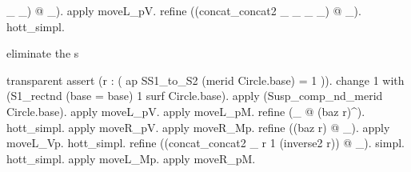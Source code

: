 \begin{coqdoccode}
\begin{coqdoccomment}
\_\coqdocindent{0.50em}
\_)\coqdocindent{0.50em}
@\coqdocindent{0.50em}
\_).\coqdocindent{0.50em}
apply\coqdocindent{0.50em}
moveL\_pV.\coqdoceol
\coqdocindent{1.00em}
refine\coqdocindent{0.50em}
((concat\_concat2\coqdocindent{0.50em}
\_\coqdocindent{0.50em}
\_\coqdocindent{0.50em}
\_\coqdocindent{0.50em}
\_)\coqdocindent{0.50em}
@\coqdocindent{0.50em}
\_).\coqdocindent{0.50em}
hott\_simpl.\coqdoceol
\coqdocindent{1.00em}
\coqdoceol
\coqdocindent{1.00em}
\begin{coqdoccomment}
\coqdocindent{0.50em}
eliminate\coqdocindent{0.50em}
the\coqdocindent{0.50em}
s\coqdocindent{0.50em}
\end{coqdoccomment}
\coqdoceol
\coqdocindent{1.00em}
transparent\coqdocindent{0.50em}
assert\coqdocindent{0.50em}
(r\coqdocindent{0.50em}
:\coqdocindent{0.50em}
(\coqdoceol
\coqdocindent{2.00em}
ap\coqdocindent{0.50em}
SS1\_to\_S2\coqdocindent{0.50em}
(merid\coqdocindent{0.50em}
Circle.base)\coqdocindent{0.50em}
=\coqdocindent{0.50em}
1\coqdoceol
\coqdocindent{1.00em}
)).\coqdoceol
\coqdocindent{1.00em}
change\coqdocindent{0.50em}
1\coqdocindent{0.50em}
with\coqdocindent{0.50em}
(S1\_rectnd\coqdocindent{0.50em}
(base\coqdocindent{0.50em}
=\coqdocindent{0.50em}
base)\coqdocindent{0.50em}
1\coqdocindent{0.50em}
surf\coqdocindent{0.50em}
Circle.base).\coqdocindent{0.50em}
\coqdoceol
\coqdocindent{1.00em}
apply\coqdocindent{0.50em}
(Susp\_comp\_nd\_merid\coqdocindent{0.50em}
Circle.base).\coqdoceol
\coqdocindent{1.00em}
apply\coqdocindent{0.50em}
moveL\_pV.\coqdocindent{0.50em}
apply\coqdocindent{0.50em}
moveL\_pM.\coqdoceol
\coqdocindent{1.00em}
refine\coqdocindent{0.50em}
(\_\coqdocindent{0.50em}
@\coqdocindent{0.50em}
(baz\coqdocindent{0.50em}
r)\^{}).\coqdocindent{0.50em}
hott\_simpl.\coqdoceol
\coqdocindent{1.00em}
apply\coqdocindent{0.50em}
moveR\_pV.\coqdocindent{0.50em}
apply\coqdocindent{0.50em}
moveR\_Mp.\coqdoceol
\coqdocindent{1.00em}
refine\coqdocindent{0.50em}
((baz\coqdocindent{0.50em}
r)\coqdocindent{0.50em}
@\coqdocindent{0.50em}
\_).\coqdocindent{0.50em}
apply\coqdocindent{0.50em}
moveL\_Vp.\coqdocindent{0.50em}
hott\_simpl.\coqdoceol
\coqdocindent{1.00em}
refine\coqdocindent{0.50em}
((concat\_concat2\coqdocindent{0.50em}
\_\coqdocindent{0.50em}
r\coqdocindent{0.50em}
1\coqdocindent{0.50em}
(inverse2\coqdocindent{0.50em}
r))\coqdocindent{0.50em}
@\coqdocindent{0.50em}
\_).\coqdocindent{0.50em}
simpl.\coqdocindent{0.50em}
hott\_simpl.\coqdoceol
\coqdocindent{1.00em}
apply\coqdocindent{0.50em}
moveL\_Mp.\coqdocindent{0.50em}
apply\coqdocindent{0.50em}
moveR\_pM.\coqdoceol

\end{coqdoccomment}
\end{coqdoccode}
